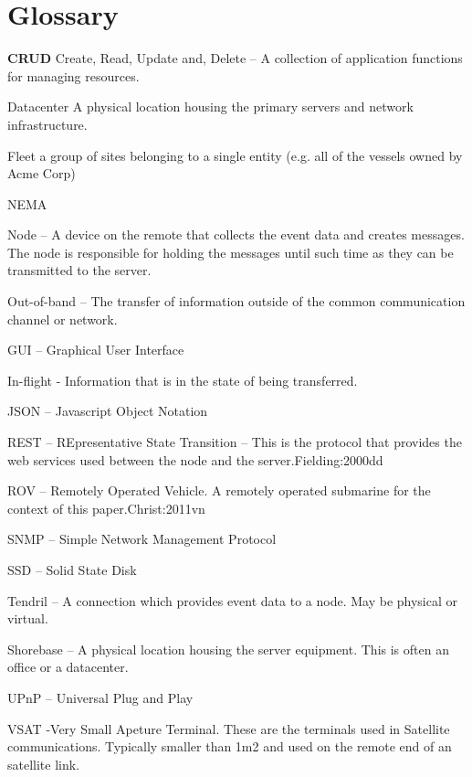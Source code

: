 \chapter{Glossary}
\textbf{CRUD}        Create, Read, Update and, Delete – A collection of application functions for managing resources. 

Datacenter      A physical location housing the primary servers and network infrastructure.

Fleet       a group of sites belonging to a single entity (e.g. all of the vessels owned  by Acme Corp)

NEMA         

Node – A device on the remote that collects the event data and creates messages. The node is responsible for holding the messages until such time as they can be transmitted to the server.

Out-of-band	– The transfer of information outside of the common communication channel or network.

GUI – Graphical User Interface

In-flight	- Information that is in the state of being transferred.

JSON – Javascript Object Notation

REST – REpresentative State Transition – This is the protocol that provides the web services used between the node and the server.{Fielding:2000dd}

ROV – Remotely Operated Vehicle. A remotely operated submarine for the context of this paper.{Christ:2011vn}

SNMP – Simple Network Management Protocol

SSD – Solid State Disk

Tendril – A connection which provides event data to a node. May be physical or virtual.

Shorebase – A physical location housing the server equipment. This is often an office or a datacenter.

UPnP – Universal Plug and Play

VSAT	-Very Small Apeture Terminal. These are the terminals used in Satellite communications. Typically smaller than 1m2 and used on the remote end of an satellite link.
